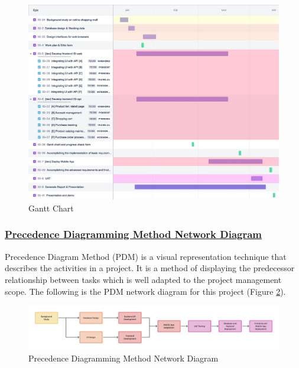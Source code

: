 \documentclass{article}
\begin{document}
\clearpage
\begin{figure}[!htp]
    \centering
    \includegraphics[width=1\textwidth]{Gantt Update.jpg}
    \caption{Gantt Chart}
    \label{fig:Gantt Chart}
\end{figure}
\clearpage
\subsubsection*{\underline{Precedence Diagramming Method Network Diagram}}
Precedence Diagram Method (PDM) is a visual representation technique that describes the activities in a project. It is a method of displaying the predecessor relationship between tasks which is well adapted to the project management scope. The following is the PDM network diagram for this project (Figure \ref{fig:Precedence Diagramming Method Network Diagram}).
\begin{figure}[!htp]
    \centering
    \includegraphics[width=1\textwidth]{PDM.png}
    \caption{Precedence Diagramming Method Network Diagram}
    \label{fig:Precedence Diagramming Method Network Diagram}
\end{figure}
\end{document}
